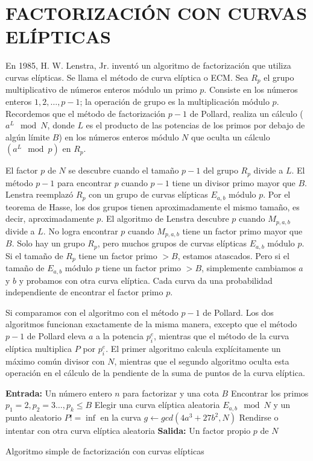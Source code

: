     \section{FACTORIZACIÓN CON CURVAS ELÍPTICAS}
    En 1985, H. W. Lenstra, Jr. inventó un algoritmo de factorización que utiliza curvas elípticas. Se llama el método de curva elíptica o ECM. Sea $R_p$ el grupo multiplicativo de números enteros módulo un primo $p$. Consiste en los números enteros ${1, 2, \dots, p - 1}$; la operación de grupo es la multiplicación módulo $p$. Recordemos que el método de factorización $p - 1$ de Pollard, realiza un cálculo ($a^L \mod N$, donde $L$ es el producto de las potencias de los primos por debajo de algún límite $B$) en los números enteros módulo $N$ que oculta un cálculo $(a^L \mod p)$ en $R_p$.

    El factor $p$ de $N$ se descubre cuando el tamaño $p - 1$ del grupo $R_p$ divide a $L$. El método $p-1$ para encontrar $p$ cuando $p-1$ tiene un divisor primo mayor que $B$. Lenstra reemplazó $R_p$ con un grupo de curvas elípticas $E_{a,b}$ módulo $p$. Por el teorema de Hasse, los dos grupos tienen aproximadamente el mismo tamaño, es decir, aproximadamente $p$. El algoritmo de Lenstra descubre $p$ cuando $M_{p,a,b}$ divide a $L$. No logra encontrar $p$ cuando $M_{p,a,b}$ tiene un factor primo mayor que $B$. Solo hay un grupo $R_p$, pero muchos grupos de curvas elípticas $E_{a,b}$ módulo $p$. Si el tamaño de $R_p$ tiene un factor primo $> B$, estamos atascados. Pero si el tamaño de $E_{a,b}$ módulo $p$ tiene un factor primo $> B$, simplemente cambiamos $a$ y $b$ y probamos con otra curva elíptica. Cada curva da una probabilidad independiente de encontrar el factor primo $p$. \citep{Lenstra1987}

    Si comparamos con el algoritmo con el método $p - 1$ de Pollard. Los dos algoritmos funcionan exactamente de la misma manera, excepto que el método $p - 1$ de Pollard eleva $a$ a la potencia $p^e_i$, mientras que el método de la curva elíptica multiplica $P$ por $p^e_i$. El primer algoritmo calcula explícitamente un máximo común divisor con $N$, mientras que el segundo algoritmo oculta esta operación en el cálculo de la pendiente de la suma de puntos de la curva elíptica.

    \begin{algorithm}[H]
        \SetAlgoLined
        \textbf{Entrada:} Un número entero $n$ para factorizar y una cota $B$\;
        Encontrar los primos $p_1 = 2, p_2 = 3 \dots, p_k \leq B$\;
        Elegir una curva elíptica aleatoria $E_{a,b} \mod N$ y un punto aleatorio $P != \inf$ en la curva\;
        $g \leftarrow gcd(4a^3 + 27b^2, N)$\;
        Rendirse o intentar con otra curva elíptica aleatoria\;
        \textbf{Salida:} Un factor propio $p$ de $N$\ 
        \caption{Algoritmo simple de factorización con curvas elípticas}
    \end{algorithm}

